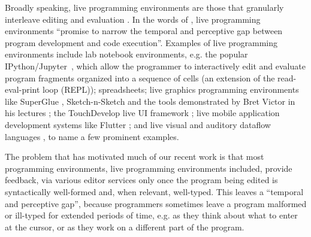 
Broadly speaking, live programming environments are those that granularly interleave editing and evaluation \cite{DBLP:conf/icse/Tanimoto13,DBLP:journals/vlc/Tanimoto90,McDirmid:2007:LUL:1297027.1297073,burckhardt2013s}. 
In the words of \citet{burckhardt2013s}, live programming environments 
``promise to narrow the temporal and perceptive gap 
between program development and code execution''. Examples of live programming environments include {lab notebook environments},
e.g. the popular IPython/Jupyter~\cite{PER-GRA:2007}, which allow the
programmer to interactively edit and evaluate program fragments organized into a
sequence of cells (an extension of the read-eval-print loop (REPL)); spreadsheets; {live graphics programming environments} like SuperGlue \cite{McDirmid:2007:LUL:1297027.1297073}, Sketch-n-Sketch \cite{DBLP:conf/pldi/ChughHSA16} and the tools demonstrated by Bret Victor in his lectures \cite{victor2012inventing}; the TouchDevelop live UI framework \cite{burckhardt2013s}; live mobile application development systems like Flutter \cite{flutter}; and live visual and auditory dataflow languages \cite{DBLP:conf/vl/BurnettAW98}, to name a few prominent examples.


The problem that has motivated much of our recent work is that most  
programming environments, live programming environments included,  provide feedback, via various editor services only once the program being edited is syntactically well-formed and, when relevant, well-typed. This leaves a ``temporal and perceptive gap'', because programmers sometimes leave a program malformed or ill-typed for extended periods of time, e.g. as they think about what to enter at the cursor, or as they work on a different part of the program.

